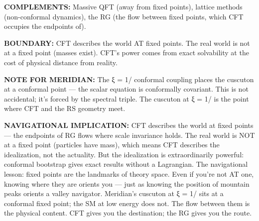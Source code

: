 \textbf{COMPLEMENTS:} Massive QFT (away from fixed points), lattice methods (non-conformal dynamics), the RG (the flow between fixed points, which CFT occupies the endpoints of).


\textbf{BOUNDARY:} CFT describes the world AT fixed points. The real world is not at a fixed point (masses exist). CFT's power comes from exact solvability at the cost of physical distance from reality.


\textbf{NOTE FOR MERIDIAN:} The ξ = 1/ conformal coupling places the cuscuton at a conformal point — the scalar equation is conformally covariant. This is not accidental; it's forced by the spectral triple. The cuscuton at ξ = 1/ is the point where CFT and the RS geometry meet.


\textbf{NAVIGATIONAL IMPLICATION:} CFT describes the world at fixed points — the endpoints of RG flows where scale invariance holds. The real world is NOT at a fixed point (particles have mass), which means CFT describes the idealization, not the actuality. But the idealization is extraordinarily powerful: conformal bootstrap gives exact results without a Lagrangian. The navigational lesson: fixed points are the landmarks of theory space. Even if you're not AT one, knowing where they are orients you — just as knowing the position of mountain peaks orients a valley navigator. Meridian's cuscuton at ξ = 1/ sits at a conformal fixed point; the SM at low energy does not. The flow between them is the physical content. CFT gives you the destination; the RG gives you the route.


\bigskip\noindent\makebox[\textwidth]{\color{rulegray}\rule{5cm}{0.3pt}}\bigskip

